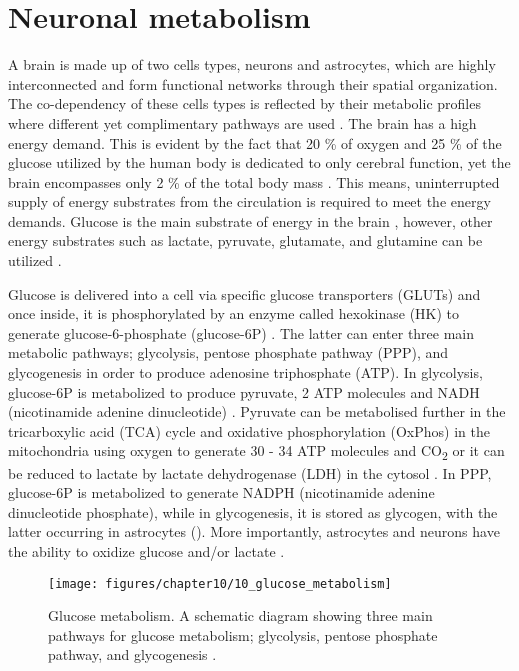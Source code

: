 \section{Neuronal metabolism}
A brain is made up of two cells types, neurons and astrocytes, which are highly interconnected and form functional networks through their spatial organization. The co-dependency of these cells types is reflected by their metabolic profiles where different yet complimentary pathways are used \citep{Belanger2011,Schonfeld2013}. The brain has a high energy demand. This is evident by the fact that 20 \% of oxygen and 25 \% of the glucose utilized by the human body is dedicated to only cerebral function, yet the brain encompasses only 2 \% of the total body mass \citep{Belanger2011}. This means, uninterrupted supply of energy substrates from the circulation is required to meet the energy demands. Glucose is the main substrate of energy in the brain 
\citep{Dienel2012,Pellerin2012}, however, other energy substrates such as lactate, pyruvate, glutamate, and glutamine can be utilized \citep{Zielke2009}.

Glucose is delivered into a cell via specific glucose transporters (GLUTs) and once inside, it is phosphorylated by an enzyme called hexokinase (HK) to generate glucose-6-phosphate (glucose-6P) \citep{Belanger2011,Herrero-Mendez2009}. The latter can enter three main metabolic pathways; glycolysis, pentose phosphate pathway (PPP), and glycogenesis in order to produce adenosine triphosphate (ATP). In glycolysis, glucose-6P is metabolized to produce pyruvate, 2 ATP molecules and NADH (nicotinamide adenine dinucleotide) \citep{Belanger2011}. Pyruvate can be metabolised further in the tricarboxylic acid (TCA) cycle and oxidative phosphorylation (OxPhos) in the mitochondria using oxygen to generate 30 - 34 ATP molecules and CO\textsubscript{2} or it can be reduced to lactate by lactate dehydrogenase (LDH) in the cytosol \citep{Belanger2011}. In PPP, glucose-6P is metabolized to generate NADPH (nicotinamide adenine dinucleotide phosphate), while in glycogenesis, it is stored as glycogen, with the latter occurring in astrocytes \citep{Belanger2011} (). More importantly, astrocytes and neurons have the ability to oxidize glucose and/or lactate \citep{Zielke2009}.

\begin{figure}[!htbp]
  \texttt{[image: figures/chapter10/10\_glucose\_metabolism]}
  \caption[Glucose metabolism]{Glucose metabolism. A schematic diagram showing three main pathways for glucose metabolism; glycolysis, pentose phosphate pathway, and glycogenesis \citep{Belanger2011} .}
  \label{fig:10_glucose_metabolism}
\end{figure}

